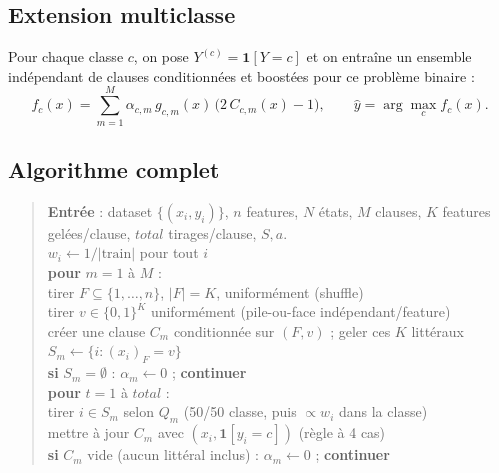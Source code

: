 \documentclass[12pt,a4paper]{article}
\begin{document}
\subsection{Extension multiclasse}

Pour chaque classe $c$, on pose $Y^{(c)}=\mathbf 1[Y{=}c]$ et on entraîne un
ensemble indépendant de clauses conditionnées et boostées pour ce problème
binaire :
\[
  f_c(x) = \sum_{m=1}^{M} \alpha_{c,m}\, g_{c,m}(x)\,\bigl(2\,C_{c,m}(x)-1\bigr),
  \qquad \hat y = \arg\max_c f_c(x).
\]

\subsection{Algorithme complet}

\begin{quote}\ttfamily\small
\textbf{Entrée} : dataset $\{(x_i,y_i)\}$, $n$ features, $N$ états, $M$
clauses, $K$ features gelées/clause, $total$ tirages/clause, $S,a$.\\[4pt]
$w_i \gets 1/|\text{train}|$ pour tout $i$\\[2pt]
\textbf{pour} $m = 1$ à $M$ :\\
\hspace*{1.5em}tirer $F\subseteq\{1,\ldots,n\}$, $|F|=K$, uniformément (shuffle)\\
\hspace*{1.5em}tirer $v\in\{0,1\}^K$ uniformément (pile-ou-face indépendant/feature)\\
\hspace*{1.5em}créer une clause $C_m$ conditionnée sur $(F,v)$ ; geler ces $K$ littéraux\\
\hspace*{1.5em}$S_m \gets \{i : (x_i)_F = v\}$\\
\hspace*{1.5em}\textbf{si} $S_m=\emptyset$ : $\alpha_m \gets 0$ ; \textbf{continuer}\\
\hspace*{1.5em}\textbf{pour} $t = 1$ à $total$ :\\
\hspace*{3em}tirer $i\in S_m$ selon $Q_m$ (50/50 classe, puis $\propto w_i$ dans la classe)\\
\hspace*{3em}mettre à jour $C_m$ avec $(x_i,\mathbf 1[y_i{=}c])$ (règle à 4 cas)\\
\hspace*{1.5em}\textbf{si} $C_m$ vide (aucun littéral inclus) : $\alpha_m \gets 0$ ; \textbf{continuer}

\end{quote}
\end{document}
